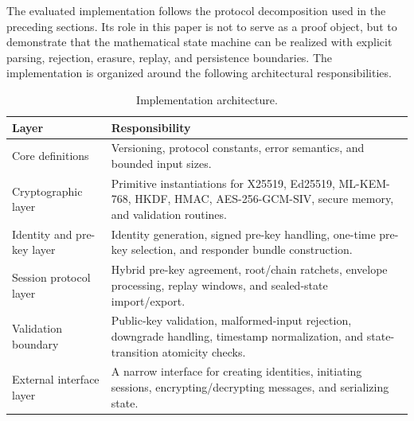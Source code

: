 \documentclass[preprint,12pt]{elsarticle}
\theoremstyle{definition}
\begin{document}
The evaluated implementation follows the protocol decomposition used in the
preceding sections. Its role in this paper is not to serve as a proof object,
but to demonstrate that the mathematical state machine can be realized with
explicit parsing, rejection, erasure, replay, and persistence boundaries. The
implementation is organized around the following architectural responsibilities.

\begin{table}[H]
\centering
\caption{Implementation architecture.}\label{tab:modules}
\small
\begin{tabularx}{\textwidth}{@{}p{}Y@{}}
\toprule
Layer & Responsibility \\
\midrule
Core definitions & Versioning, protocol constants, error semantics, and bounded input sizes. \\
Cryptographic layer & Primitive instantiations for X25519, Ed25519, ML-KEM-768, HKDF, HMAC, AES-256-GCM-SIV, secure memory, and validation routines. \\
Identity and pre-key layer & Identity generation, signed pre-key handling, one-time pre-key selection, and responder bundle construction. \\
Session protocol layer & Hybrid pre-key agreement, root/chain ratchets, envelope processing, replay windows, and sealed-state import/export. \\
Validation boundary & Public-key validation, malformed-input rejection, downgrade handling, timestamp normalization, and state-transition atomicity checks. \\
External interface layer & A narrow interface for creating identities, initiating sessions, encrypting/decrypting messages, and serializing state. \\
\bottomrule
\end{tabularx}
\end{table}
\end{document}
